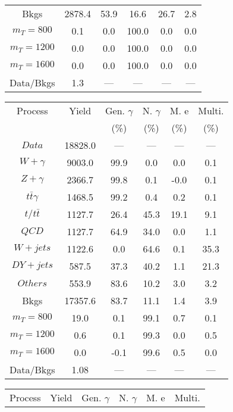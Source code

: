 \begin{figure}
\begin{minipage}[c]{0.32\textwidth}
{\begin{tabular}{cccccc}
Bkgs &  2878.4 &  53.9 &  16.6 &  26.7 &  2.8\\
$ m_{T} = 800 $ &  0.1 &  0.0 &  100.0 &  0.0 &  0.0\\
$ m_{T} = 1200 $ &  0.0 &  0.0 &  100.0 &  0.0 &  0.0\\
$ m_{T} = 1600 $ &  0.0 &  0.0 &  100.0 &  0.0 &  0.0\\
Data/Bkgs &  1.3 &  --- &  --- &  --- &  ---\\
\hline
\end{tabular}
}
\end{minipage}
\begin{minipage}[c]{0.32\textwidth}
\centering
\tiny{
\begin{tabular}{cccccc}
\hline
Process & Yield & Gen. $\gamma$ & N. $\gamma$ & M. e & Multi. \\
 &  & (\%) & (\%) & (\%) & (\%)  \\
\hline
                                                                      $ Data $ &  18828.0 &  --- &  --- &  --- &  ---\\
$ W+\gamma $ &  9003.0 &  99.9 &  0.0 &  0.0 &  0.1\\
$ Z+\gamma $ &  2366.7 &  99.8 &  0.1 &  -0.0 &  0.1\\
$ t\bar{t}\gamma $ &  1468.5 &  99.2 &  0.4 &  0.2 &  0.1\\
$ t/t\bar{t} $ &  1127.7 &  26.4 &  45.3 &  19.1 &  9.1\\
$ QCD $ &  1127.7 &  64.9 &  34.0 &  0.0 &  1.1\\
$ W+jets $ &  1122.6 &  0.0 &  64.6 &  0.1 &  35.3\\
$ DY+jets $ &  587.5 &  37.3 &  40.2 &  1.1 &  21.3\\
$ Others $ &  553.9 &  83.6 &  10.2 &  3.0 &  3.2\\
Bkgs &  17357.6 &  83.7 &  11.1 &  1.4 &  3.9\\
$ m_{T} = 800 $ &  19.0 &  0.1 &  99.1 &  0.7 &  0.1\\
$ m_{T} = 1200 $ &  0.6 &  0.1 &  99.3 &  0.0 &  0.5\\
$ m_{T} = 1600 $ &  0.0 &  -0.1 &  99.6 &  0.5 &  0.0\\
Data/Bkgs &  1.08 &  --- &  --- &  --- &  ---\\
\hline
\end{tabular}
}
\end{minipage}
\begin{minipage}[c]{0.32\textwidth}
\centering
\tiny{
\begin{tabular}{cccccc}
\hline
Process & Yield & Gen. $\gamma$ & N. $\gamma$ & M. e & Multi. \\

\end{tabular}}
\end{minipage}
\end{figure}
